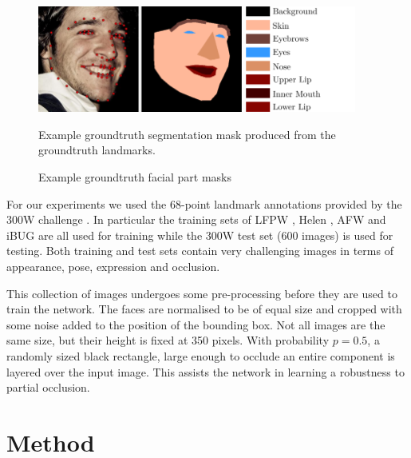 \begin{figure}
\centering
\includegraphics[height=3.5cm]{figs/gtmasks.pdf}
\hspace{-1.4mm}
\includegraphics[height=3.5cm]{figs/gtmasks_key.pdf}
\caption{Example groundtruth facial part masks}{Example groundtruth
  segmentation mask produced from the groundtruth landmarks.}
\label{fig:gtmasks}
\end{figure}

For our experiments we used the 68-point landmark annotations provided
by the 300W challenge \cite{sagonas2013300}. In particular the
training sets of LFPW \cite{belhumeur2011localizing}, Helen
\cite{le2012interactive}, AFW \cite{zhu2012face} and iBUG
\cite{sagonas2013300} are all used for training while the 300W test
set (600 images) is used for testing. Both training and test sets
contain very challenging images in terms of appearance, pose,
expression and occlusion.

This collection of images undergoes some pre-processing before they
are used to train the network. The faces are normalised to be of equal
size and cropped with some noise added to the position of the bounding
box. Not all images are the same size, but their height is fixed at
350 pixels. With probability $p=0.5$, a randomly sized black
rectangle, large enough to occlude an entire component is layered over
the input image. This assists the network in learning a robustness to
partial occlusion.



\section{Method}
\label{sec:proposed}


